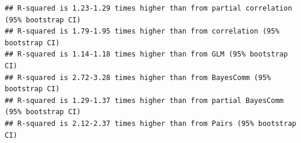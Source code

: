 \documentclass[11pt,]{article}
\newenvironment{Shaded}{\begin{snugshade}}{\end{snugshade}}
\newcommand{\KeywordTok}[1]{\textcolor[rgb]{0.13,0.29,0.53}{\textbf{{#1}}}}
\newcommand{\DecValTok}[1]{\textcolor[rgb]{0.00,0.00,0.81}{{#1}}}
\newcommand{\StringTok}[1]{\textcolor[rgb]{0.31,0.60,0.02}{{#1}}}
\newcommand{\NormalTok}[1]{{#1}}
\begin{document}
\begin{Shaded}
\end{Shaded}

\begin{verbatim}
## R-squared is 1.23-1.29 times higher than from partial correlation (95% bootstrap CI)
## R-squared is 1.79-1.95 times higher than from correlation (95% bootstrap CI)
## R-squared is 1.14-1.18 times higher than from GLM (95% bootstrap CI)
## R-squared is 2.72-3.28 times higher than from BayesComm (95% bootstrap CI)
## R-squared is 1.29-1.37 times higher than from partial BayesComm (95% bootstrap CI)
## R-squared is 2.12-2.37 times higher than from Pairs (95% bootstrap CI)
\end{verbatim}
\end{document}
